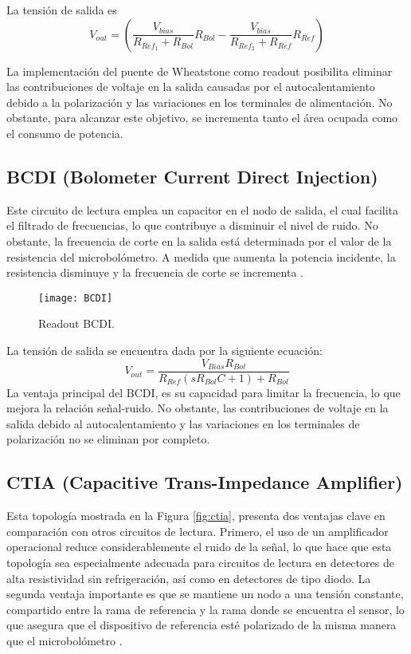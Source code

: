 La tensión de salida es
        \begin{equation}
        V_{out} =\left(\frac{V_{bias}}{R_{Ref_1} + R_{Bol}}R_{Bol} - \frac{V_{bias}}{R_{Ref_2}+ R_{Ref}}R_{Ref} \right)
        \label{eq:Puente}
        \end{equation} 

La implementación del puente de Wheatstone como readout posibilita eliminar las contribuciones de voltaje en la salida causadas por el autocalentamiento debido a la polarización y las variaciones en los terminales de alimentación. No obstante, para alcanzar este objetivo, se incrementa tanto el área ocupada como el consumo de potencia.

\subsection{BCDI (Bolometer Current Direct Injection)}
Este circuito de lectura emplea un capacitor en el nodo de salida, el cual facilita el filtrado de frecuencias, lo que contribuye a disminuir el nivel de ruido. No obstante, la frecuencia de corte en la salida está determinada por el valor de la resistencia del microbolómetro. A medida que aumenta la potencia incidente, la resistencia disminuye y la frecuencia de corte se incrementa \cite{BlancoMDA}.
            \begin{figure}[hbtp]
                \centering
                \texttt{[image: BCDI]}
                \caption{Readout BCDI.}
                \label{fig:BCDI}
            \end{figure}

La tensión de salida se encuentra dada por la siguiente ecuación:
        \begin{equation}
        V_{out} =\frac{V_{Bias} R_{Bol}}{R_{Ref} (sR_{Bol} C+1) + R_{Bol}}
        \label{eq:bcdi}
        \end{equation}
La ventaja principal del BCDI, es su capacidad para limitar la frecuencia, lo que mejora la relación señal-ruido. No obstante, las contribuciones de voltaje en la salida debido al autocalentamiento y las variaciones en los terminales de polarización no se eliminan por completo.
\newpage
\subsection{CTIA (Capacitive Trans-Impedance Amplifier)}

Esta topología mostrada en la Figura \ref{fig:ctia}, presenta dos ventajas clave en comparación con otros circuitos de lectura. Primero, el uso de un amplificador operacional reduce considerablemente el ruido de la señal, lo que hace que esta topología sea especialmente adecuada para circuitos de lectura en detectores de alta resistividad sin refrigeración, así como en detectores de tipo diodo. La segunda ventaja importante es que se mantiene un nodo a una tensión constante, compartido entre la rama de referencia y la rama donde se encuentra el sensor, lo que asegura que el dispositivo de referencia esté polarizado de la misma manera que el microbolómetro \cite{BlancoMDA}.

